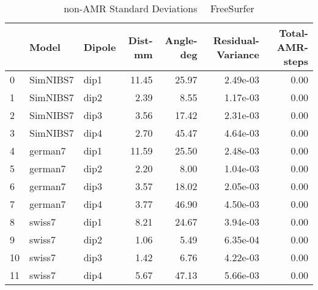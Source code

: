 \documentclass{article}
\begin{document}
\begin{table}
\begin{tabular}{lllrrrr}
\toprule
& Model& Dipole& Dist-mm& Angle-deg& Residual-Variance& Total-AMR-steps\\
\midrule
\rowcolor{lightgray}0 & SimNIBS7 & dip1 & 11.45 & 25.97 & 2.49e-03 & 0.00\\
\rowcolor{lightgray}1 & SimNIBS7 & dip2 & 2.39 & 8.55 & 1.17e-03 & 0.00\\
\rowcolor{lightgray}2 & SimNIBS7 & dip3 & 3.56 & 17.42 & 2.31e-03 & 0.00\\
\rowcolor{lightgray}3 & SimNIBS7 & dip4 & 2.70 & 45.47 & 4.64e-03 & 0.00\\
\rowcolor{yellow}4 & german7 & dip1 & 11.59 & 25.50 & 2.48e-03 & 0.00\\
\rowcolor{yellow}5 & german7 & dip2 & 2.20 & 8.00 & 1.04e-03 & 0.00\\
\rowcolor{yellow}6 & german7 & dip3 & 3.57 & 18.02 & 2.05e-03 & 0.00\\
\rowcolor{yellow}7 & german7 & dip4 & 3.77 & 46.90 & 4.50e-03 & 0.00\\
\rowcolor{pink}8 & swiss7 & dip1 & 8.21 & 24.67 & 3.94e-03 & 0.00\\
\rowcolor{pink}9 & swiss7 & dip2 & 1.06 & 5.49 & 6.35e-04 & 0.00\\
\rowcolor{pink}10 & swiss7 & dip3 & 1.42 & 6.76 & 4.22e-03 & 0.00\\
\rowcolor{pink}11 & swiss7 & dip4 & 5.67 & 47.13 & 5.66e-03 & 0.00\\
\end{tabular}
\caption{non-AMR Standard Deviations \ \textemdash \ FreeSurfer}
\end{table}
\end{document}
